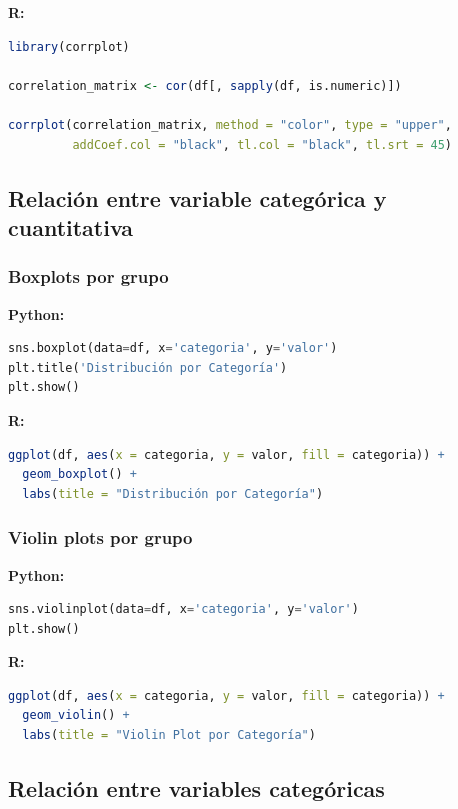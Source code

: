 \documentclass[a4paper,11pt]{article}
\begin{document}
\textbf{R:}
\begin{lstlisting}[language=R]
library(corrplot)

correlation_matrix <- cor(df[, sapply(df, is.numeric)])

corrplot(correlation_matrix, method = "color", type = "upper",
         addCoef.col = "black", tl.col = "black", tl.srt = 45)
\end{lstlisting}

\subsection{Relación entre variable categórica y cuantitativa}

\subsubsection{Boxplots por grupo}

\textbf{Python:}
\begin{lstlisting}[language=Python]
sns.boxplot(data=df, x='categoria', y='valor')
plt.title('Distribución por Categoría')
plt.show()
\end{lstlisting}

\textbf{R:}
\begin{lstlisting}[language=R]
ggplot(df, aes(x = categoria, y = valor, fill = categoria)) +
  geom_boxplot() +
  labs(title = "Distribución por Categoría")
\end{lstlisting}

\subsubsection{Violin plots por grupo}

\textbf{Python:}
\begin{lstlisting}[language=Python]
sns.violinplot(data=df, x='categoria', y='valor')
plt.show()
\end{lstlisting}

\textbf{R:}
\begin{lstlisting}[language=R]
ggplot(df, aes(x = categoria, y = valor, fill = categoria)) +
  geom_violin() +
  labs(title = "Violin Plot por Categoría")
\end{lstlisting}

\subsection{Relación entre variables categóricas}
\end{document}
